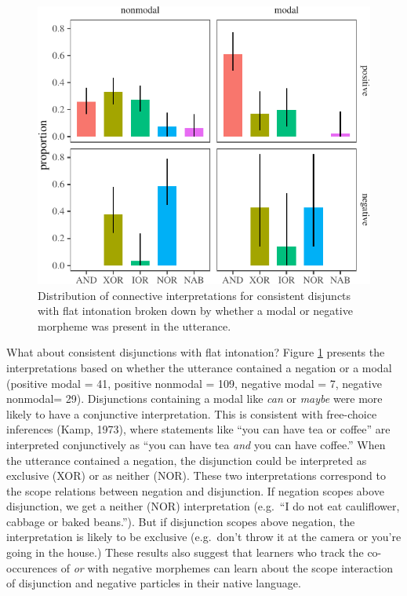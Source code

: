 \documentclass[
  english,
  ,man,floatsintext]{apa6}
\begin{document}
\begin{figure}[H]

{\centering \includegraphics{figs/negModalPlot-1} 

}

\caption{Distribution of connective interpretations for consistent disjuncts with flat intonation broken down by whether a modal or negative morpheme was present in the utterance.}\label{fig:negModalPlot}
\end{figure}

What about consistent disjunctions with flat intonation? Figure \ref{fig:negModalPlot} presents the interpretations based on whether the utterance contained a negation or a modal (positive modal = 41, positive nonmodal = 109, negative modal = 7, negative nonmodal= 29). Disjunctions containing a modal like \emph{can} or \emph{maybe} were more likely to have a conjunctive interpretation. This is consistent with free-choice inferences (Kamp, 1973), where statements like ``you can have tea or coffee'' are interpreted conjunctively as ``you can have tea \emph{and} you can have coffee.'' When the utterance contained a negation, the disjunction could be interpreted as exclusive (XOR) or as neither (NOR). These two interpretations correspond to the scope relations between negation and disjunction. If negation scopes above disjunction, we get a neither (NOR) interpretation (e.g.~``I do not eat cauliflower, cabbage or baked beans.''). But if disjunction scopes above negation, the interpretation is likely to be exclusive (e.g.~don't throw it at the camera or you're going in the house.) These results also suggest that learners who track the co-occurences of \emph{or} with negative morphemes can learn about the scope interaction of disjunction and negative particles in their native language.
\end{document}

